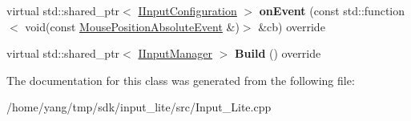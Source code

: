 \begin{DoxyCompactItemize}
\item 
virtual std\+::shared\+\_\+ptr$<$ \hyperlink{class_s_l_1_1_input___lite_1_1_i_input_configuration}{I\+Input\+Configuration} $>$ {\bfseries on\+Event} (const std\+::function$<$ void(const \hyperlink{struct_s_l_1_1_input___lite_1_1_mouse_position_absolute_event}{Mouse\+Position\+Absolute\+Event} \&)$>$ \&cb) override\hypertarget{class_s_l_1_1_input___lite_1_1_input_configuration_accf3243a8d10fc255ee9a0fcb1fa221c}{}\label{class_s_l_1_1_input___lite_1_1_input_configuration_accf3243a8d10fc255ee9a0fcb1fa221c}

\item 
virtual std\+::shared\+\_\+ptr$<$ \hyperlink{class_s_l_1_1_input___lite_1_1_i_input_manager}{I\+Input\+Manager} $>$ {\bfseries Build} () override\hypertarget{class_s_l_1_1_input___lite_1_1_input_configuration_afc9bb0c73f4ebfd4ceac6f059299b825}{}\label{class_s_l_1_1_input___lite_1_1_input_configuration_afc9bb0c73f4ebfd4ceac6f059299b825}

\end{DoxyCompactItemize}


The documentation for this class was generated from the following file\+:\begin{DoxyCompactItemize}
\item 
/home/yang/tmp/sdk/input\+\_\+lite/src/Input\+\_\+\+Lite.\+cpp\end{DoxyCompactItemize}
